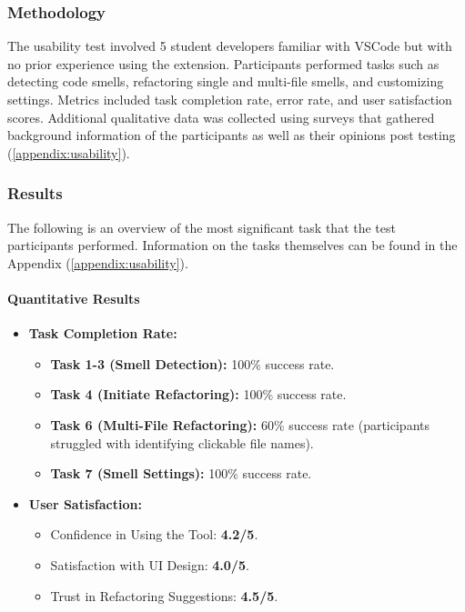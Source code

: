 \documentclass[12pt, titlepage]{article}
\begin{document}
\subsubsection{Methodology}
The usability test involved 5 student developers familiar with VSCode
but with no prior experience using the extension. Participants
performed tasks such as detecting code smells, refactoring single and
multi-file smells, and customizing settings. Metrics included task
completion rate, error rate, and user satisfaction scores. Additional
qualitative data was collected using surveys that gathered background
information of the participants as well as their opinions post
testing (\ref{appendix:usability}).

\subsubsection{Results}

The following is an overview of the most significant task that the
test participants performed. Information on the tasks themselves can
be found in the Appendix (\ref{appendix:usability}).

\paragraph{Quantitative Results}
\begin{itemize}
  \item \textbf{Task Completion Rate:}
    \begin{itemize}
      \item \textbf{Task 1-3 (Smell Detection):} 100\% success rate.
      \item \textbf{Task 4 (Initiate Refactoring):} 100\% success rate.
      \item \textbf{Task 6 (Multi-File Refactoring):} 60\% success
        rate (participants struggled with identifying clickable file names).
      \item \textbf{Task 7 (Smell Settings):} 100\% success rate.
    \end{itemize}
  \item \textbf{User Satisfaction:}
    \begin{itemize}
      \item Confidence in Using the Tool: \textbf{4.2/5}.
      \item Satisfaction with UI Design: \textbf{4.0/5}.
      \item Trust in Refactoring Suggestions: \textbf{4.5/5}.
    \end{itemize}
\end{itemize}
\end{document}
